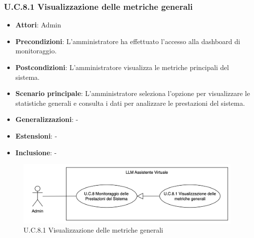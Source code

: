\subsubsection{U.C.8.1 Visualizzazione delle metriche generali}
\begin{itemize}
    \item \textbf{Attori}: Admin
    \item \textbf{Precondizioni}: L'amministratore ha effettuato l'accesso alla dashboard di monitoraggio. 
    \item \textbf{Postcondizioni}: L'amministratore visualizza le metriche principali del sistema.
    \item \textbf{Scenario principale}:  L'amministratore seleziona l'opzione per visualizzare le statistiche generali e consulta i dati per analizzare le prestazioni del sistema.
    \item \textbf{Generalizzazioni}: -
    \item \textbf{Estensioni}: -
    \item \textbf{Inclusione}: -
\end{itemize}
\begin{figure}[H]
    \centering
    \includegraphics[width=\textwidth]{img/U.C.8.1.png}
    \caption{U.C.8.1 Visualizzazione delle metriche generali}
\end{figure}
\newpage

